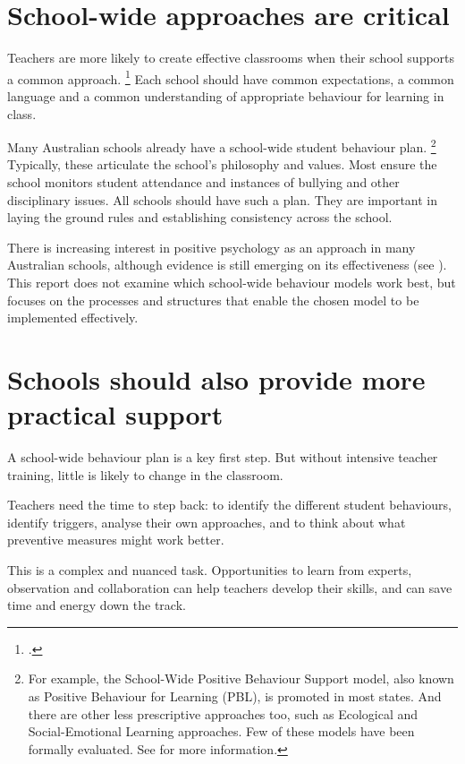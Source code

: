 \documentclass{grattan}
\begin{document}
\section{School-wide approaches are critical}\label{sec:consistent-school-wide-approaches}
Teachers are more likely to create effective classrooms when their school supports a common approach.%
    \footcite{Epstein2008ReducingBehaviorProblems}
Each school should have common expectations, a common language and a common understanding of appropriate behaviour for learning in class.

Many Australian schools already have a school-wide student behaviour plan.%
    \footnote{For example, the School-Wide Positive Behaviour Support model, also known as Positive Behaviour for Learning (PBL), is promoted in most states. And there are other less prescriptive approaches too, such as Ecological and Social-Emotional Learning approaches. Few of these models have been formally evaluated. See \textcite{ONeillStephenson2014EvidenceBasedClassroom} for more information.}
Typically, these articulate the school's philosophy and values. Most ensure the school monitors student attendance and instances of bullying and other disciplinary issues. All schools should have such a plan. They are important in laying the ground rules and establishing consistency across the school.


There is increasing interest in positive psychology as an approach in many Australian schools, although evidence is still emerging on its effectiveness (see ). This report does not examine which school-wide behaviour models work best, but focuses on the processes and structures that enable the chosen model to be implemented effectively.

\section{Schools should also provide more practical support}\label{sec:school-behaviour-plans}
A school-wide behaviour plan is a key first step. But without intensive teacher training, little is likely to change in the classroom.

Teachers need the time to step back: to identify the different student behaviours, identify triggers, analyse their own approaches, and to think about what preventive measures might work better.

This is a complex and nuanced task. Opportunities to learn from experts, observation and collaboration can help teachers develop their skills, and can save time and energy down the track.
\end{document}
